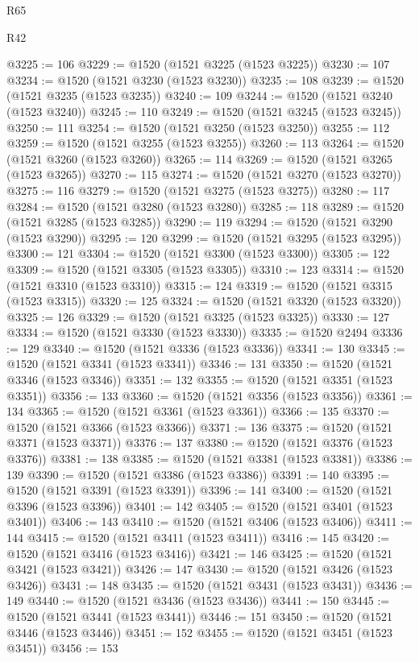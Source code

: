 \begin{lexlean}{R65}
\begin{lexlean}{R42}
\begin{coremodule}
{{{{{{{{{{{{{{{{{{{{{{{{{{{{{{{{{{{{{{{{{{{{{{{{{{{{{{{{{{{{{{{{{{{{{{{{{{{{{{{{{{{{{{{{{{{{{{{{{{{{{{{{{{{{{{{{{{{{{{{{{{{{{{{{{{{{{{{{{{{{{{{{{{{{{{{{{{{{{{{{{{{{{{{{{{{{{{{{{{{{{{{{@3225 := 106
@3229 := @1520 (@1521 @3225 (@1523 @3225))
@3230 := 107
@3234 := @1520 (@1521 @3230 (@1523 @3230))
@3235 := 108
@3239 := @1520 (@1521 @3235 (@1523 @3235))
@3240 := 109
@3244 := @1520 (@1521 @3240 (@1523 @3240))
@3245 := 110
@3249 := @1520 (@1521 @3245 (@1523 @3245))
@3250 := 111
@3254 := @1520 (@1521 @3250 (@1523 @3250))
@3255 := 112
@3259 := @1520 (@1521 @3255 (@1523 @3255))
@3260 := 113
@3264 := @1520 (@1521 @3260 (@1523 @3260))
@3265 := 114
@3269 := @1520 (@1521 @3265 (@1523 @3265))
@3270 := 115
@3274 := @1520 (@1521 @3270 (@1523 @3270))
@3275 := 116
@3279 := @1520 (@1521 @3275 (@1523 @3275))
@3280 := 117
@3284 := @1520 (@1521 @3280 (@1523 @3280))
@3285 := 118
@3289 := @1520 (@1521 @3285 (@1523 @3285))
@3290 := 119
@3294 := @1520 (@1521 @3290 (@1523 @3290))
@3295 := 120
@3299 := @1520 (@1521 @3295 (@1523 @3295))
@3300 := 121
@3304 := @1520 (@1521 @3300 (@1523 @3300))
@3305 := 122
@3309 := @1520 (@1521 @3305 (@1523 @3305))
@3310 := 123
@3314 := @1520 (@1521 @3310 (@1523 @3310))
@3315 := 124
@3319 := @1520 (@1521 @3315 (@1523 @3315))
@3320 := 125
@3324 := @1520 (@1521 @3320 (@1523 @3320))
@3325 := 126
@3329 := @1520 (@1521 @3325 (@1523 @3325))
@3330 := 127
@3334 := @1520 (@1521 @3330 (@1523 @3330))
@3335 := @1520 @2494
@3336 := 129
@3340 := @1520 (@1521 @3336 (@1523 @3336))
@3341 := 130
@3345 := @1520 (@1521 @3341 (@1523 @3341))
@3346 := 131
@3350 := @1520 (@1521 @3346 (@1523 @3346))
@3351 := 132
@3355 := @1520 (@1521 @3351 (@1523 @3351))
@3356 := 133
@3360 := @1520 (@1521 @3356 (@1523 @3356))
@3361 := 134
@3365 := @1520 (@1521 @3361 (@1523 @3361))
@3366 := 135
@3370 := @1520 (@1521 @3366 (@1523 @3366))
@3371 := 136
@3375 := @1520 (@1521 @3371 (@1523 @3371))
@3376 := 137
@3380 := @1520 (@1521 @3376 (@1523 @3376))
@3381 := 138
@3385 := @1520 (@1521 @3381 (@1523 @3381))
@3386 := 139
@3390 := @1520 (@1521 @3386 (@1523 @3386))
@3391 := 140
@3395 := @1520 (@1521 @3391 (@1523 @3391))
@3396 := 141
@3400 := @1520 (@1521 @3396 (@1523 @3396))
@3401 := 142
@3405 := @1520 (@1521 @3401 (@1523 @3401))
@3406 := 143
@3410 := @1520 (@1521 @3406 (@1523 @3406))
@3411 := 144
@3415 := @1520 (@1521 @3411 (@1523 @3411))
@3416 := 145
@3420 := @1520 (@1521 @3416 (@1523 @3416))
@3421 := 146
@3425 := @1520 (@1521 @3421 (@1523 @3421))
@3426 := 147
@3430 := @1520 (@1521 @3426 (@1523 @3426))
@3431 := 148
@3435 := @1520 (@1521 @3431 (@1523 @3431))
@3436 := 149
@3440 := @1520 (@1521 @3436 (@1523 @3436))
@3441 := 150
@3445 := @1520 (@1521 @3441 (@1523 @3441))
@3446 := 151
@3450 := @1520 (@1521 @3446 (@1523 @3446))
@3451 := 152
@3455 := @1520 (@1521 @3451 (@1523 @3451))
@3456 := 153
}}}}}}}}}}}}}}}}}}}}}}}}}}}}}}}}}}}}}}}}}}}}}}}}}}}}}}}}}}}}}}}}}}}}}}}}}}}}}}}}}}}}}}}}}}}}}}}}}}}}}}}}}}}}}}}}}}}}}}}}}}}}}}}}}}}}}}}}}}}}}}}}}}}}}}}}}}}}}}}}}}}}}}}}}}}}}}}}}}}}}}}}
\end{coremodule}
\end{lexlean}
\end{lexlean}
